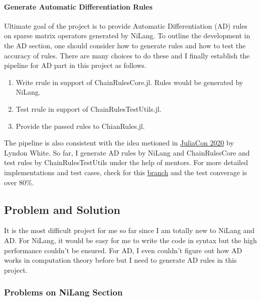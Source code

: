 \paragraph{Generate Automatic Differentiation Rules}
Ultimate goal of the project is to provide Automatic Differentiation (AD) rules on sparse 
matrix operators generated by NiLang. To outline the development in the AD section, 
one should consider how to generate rules and how to test the accuracy of rules. 
There are many choices to do these and I finally establish the pipeline for AD part in this project as follows.
\begin{enumerate}[(1)]
    \item Write rrule in support of ChainRulesCore.jl. Rules would be generated by NiLang.
    \item Test rrule in support of ChainRulesTestUtils.jl. 
    \item Provide the passed rules to ChianRules.jl. 
\end{enumerate}  
The pipeline is also consistent with the idea metioned in 
\href{https://raw.githack.com/oxinabox/ChainRulesJuliaCon2020/main/out/build/index.html#1}{JuliaCon 2020} by Lyndon White.
So far, I generate AD rules by NiLang and ChainRulesCore and test rules by ChainRulesTestUtils
under the help of mentors. For more detailed implementations and test cases, check for this 
\href{https://github.com/jieli-matrix/NiSparseArrays.jl/tree/master}{branch} and  
the test converage is over 80\%.

\subsection{Problem and Solution}
It is the most difficult project for me so far since I am totally new to NiLang and AD. 
For NiLang, it would be easy for me to write the code in syntax but the high performance 
couldn't be ensured. For AD, I even couldn't figure out how AD works in computation theory 
before but I need to generate AD rules in this project. 
\subsubsection{Problems on NiLang Section}
